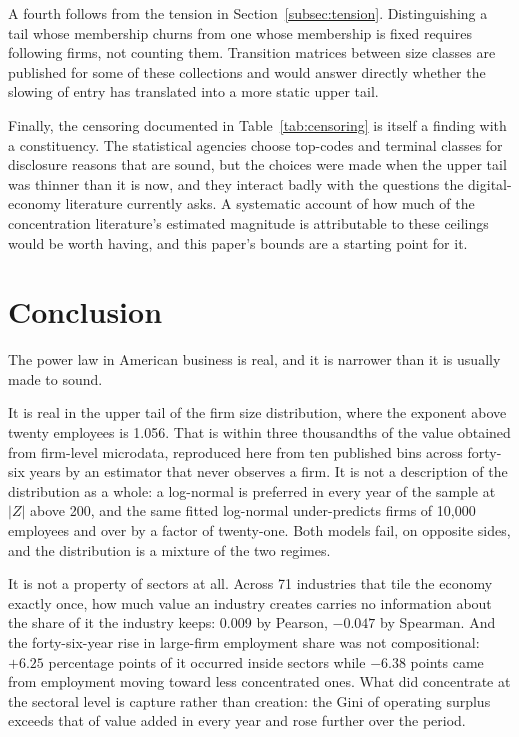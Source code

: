 \documentclass[jrfm,article,submit,pdftex,moreauthors]{Definitions/mdpi}
\begin{document}
A fourth follows from the tension in Section~\ref{subsec:tension}. Distinguishing a tail whose
membership churns from one whose membership is fixed requires following firms, not counting
them. Transition matrices between size classes are published for some of these collections
and would answer directly whether the slowing of entry has translated into a more static
upper tail.

Finally, the censoring documented in Table~\ref{tab:censoring} is itself a finding with a
constituency. The statistical agencies choose top-codes and terminal classes for disclosure
reasons that are sound, but the choices were made when the upper tail was thinner than it is
now, and they interact badly with the questions the digital-economy literature currently
asks. A systematic account of how much of the concentration literature's estimated magnitude
is attributable to these ceilings would be worth having, and this paper's bounds are a
starting point for it.

\section{Conclusion}
\label{sec:conclusion}

The power law in American business is real, and it is narrower than it is usually made to
sound.

It is real in the upper tail of the firm size distribution, where the exponent above twenty
employees is 1.056. That is within three thousandths of the value \citet{Axtell2001} obtained
from firm-level microdata, reproduced here from ten published bins across forty-six years by
an estimator that never observes a firm. It is not a description of the distribution as a whole:
a log-normal is preferred in every year of the sample at $|Z|$ above 200, and the same fitted
log-normal under-predicts firms of 10{,}000 employees and over by a factor of twenty-one.
Both models fail, on opposite sides, and the distribution is a mixture of the two regimes.

It is not a property of sectors at all. Across 71 industries that tile the economy exactly
once, how much value an industry creates carries no information about the share of it the
industry keeps: 0.009 by Pearson, $-0.047$ by Spearman. And the forty-six-year rise in large-firm employment share was not compositional:
$+6.25$ percentage points of it occurred inside sectors while $-6.38$ points came from
employment moving toward less concentrated ones. What did concentrate at the sectoral level is capture rather than
creation: the Gini of operating surplus exceeds that of value added in every year and rose
further over the period.
\end{document}

